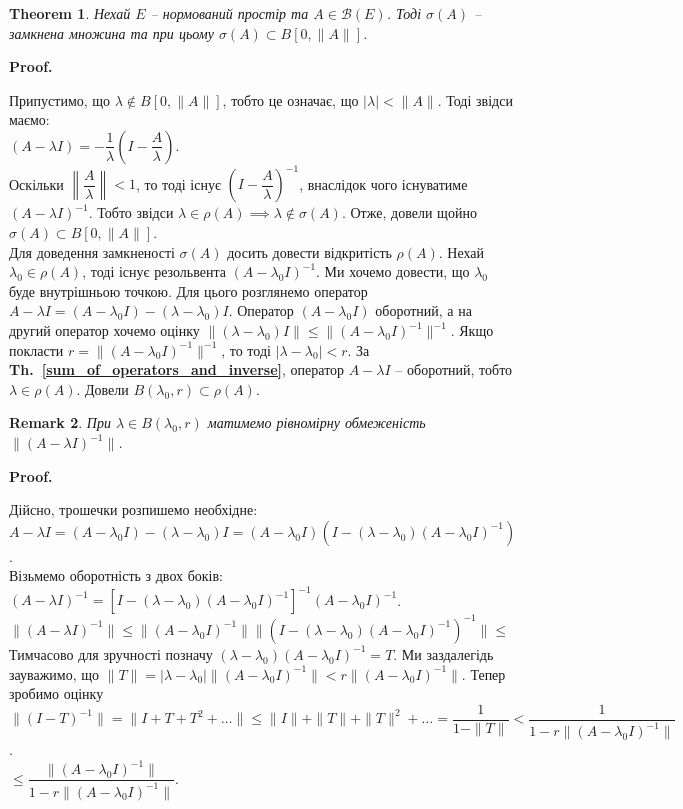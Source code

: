 \documentclass[a4paper, 10pt]{article}
\makeatletter
\theoremstyle{theoremdd}
\newtheorem{theorem}{Theorem}[subsection]
\theoremstyle{theoremdd}
\theoremstyle{theoremdd}
\theoremstyle{theoremdd}
\theoremstyle{theoremdd}
\theoremstyle{theoremdd}
\newtheorem{remark}[theorem]{Remark}
\theoremstyle{theoremdd}
\theoremstyle{theoremdd}
\newcommand\thref[1]{\textbf{Th.~\ref{#1}}}
\renewenvironment{proof}[1][Proof.\\]{\par
\pushQED{\hfill \qed}%
\normalfont \topsep6\p@\@plus6\p@\relax
\trivlist
\item\relax
{\bfseries
#1\@addpunct{.}}\hspace\labelsep\ignorespaces
}{%
\popQED\endtrivlist\@endpefalse
}
\makeatother
\begin{document}
\begin{theorem}
Нехай $E$ -- нормований простір та $A \in \mathcal{B}(E)$. Тоді $\sigma(A)$ -- замкнена множина та при цьому $\sigma(A) \subset B[0, \|A\|]$.
\end{theorem}

\begin{proof}
Припустимо, що $\lambda \notin B[0, \|A\|]$, тобто це означає, що $|\lambda| < \|A\|$. Тоді звідси маємо:\\
$(A-\lambda I) = -\dfrac{1}{\lambda}\left(I - \dfrac{A}{\lambda}\right)$.\\
Оскільки $\left\| \dfrac{A}{\lambda} \right\| < 1$, то тоді існує $\left(I - \dfrac{A}{\lambda}\right)^{-1}$, внаслідок чого існуватиме $(A-\lambda I)^{-1}$. Тобто звідси $\lambda \in \rho(A) \implies \lambda \notin \sigma(A)$. Отже, довели щойно $\sigma(A) \subset B[0, \|A\|]$.\\
Для доведення замкненості $\sigma(A)$ досить довести відкритість $\rho(A)$. Нехай $\lambda_0 \in \rho(A)$, тоді існує резольвента $(A-\lambda_0 I)^{-1}$. Ми хочемо довести, що $\lambda_0$ буде внутрішньою точкою. Для цього розглянемо оператор $A-\lambda I = (A-\lambda_0 I) - (\lambda - \lambda_0)I$. Оператор $(A-\lambda_0 I)$ оборотний, а на другий оператор хочемо оцінку $\| (\lambda - \lambda_0) I\| \leq \| (A-\lambda_0 I)^{-1} \|^{-1}$. Якщо покласти $r = \|(A-\lambda_0 I)^{-1}\|^{-1}$, то тоді $|\lambda-\lambda_0| < r$. За \thref{sum_of_operators_and_inverse}, оператор $A-\lambda I$ -- оборотний, тобто $\lambda \in \rho(A)$. Довели $B(\lambda_0,r) \subset \rho(A)$.
\end{proof}

\begin{remark}
При $\lambda \in B(\lambda_0,r)$ матимемо рівномірну обмеженість $\|(A-\lambda I)^{-1}\|$.
\end{remark}

\begin{proof}
Дійсно, трошечки розпишемо необхідне:\\
$A -\lambda I = (A - \lambda_0 I) - (\lambda - \lambda_0) I = (A-\lambda_0 I) \left(I - (\lambda - \lambda_0)(A -\lambda_0 I)^{-1}\right)$.\\
Візьмемо оборотність з двох боків:\\
$(A - \lambda I)^{-1} = \left[ I - (\lambda - \lambda_0)(A-\lambda_0 I)^{-1}\right]^{-1} (A-\lambda_0 I)^{-1}$.\\
$\|(A-\lambda I)^{-1}\| \leq \| (A-\lambda_0 I)^{-1} \| \| (I- (\lambda - \lambda_0)(A-\lambda_0 I)^{-1})^{-1}\| \boxed{\leq}$\\
Тимчасово для зручності позначу $(\lambda-\lambda_0)(A - \lambda_0 I)^{-1} = T$. Ми заздалегідь зауважимо, що $\|T\| = |\lambda-\lambda_0| \|(A-\lambda_0I)^{-1}\| < r \|(A-\lambda_0 I)^{-1}\|$. Тепер зробимо оцінку\\
$\|(I-T)^{-1}\| = \| I + T + T^2 + \dots \| \leq \|I\| + \|T\| + \|T\|^2 + \dots = \dfrac{1}{1- \|T\|} < \dfrac{1}{1 - r \|(A-\lambda_0 I)^{-1} \|}$.\\
$\boxed{\leq} \dfrac{\|(A-\lambda_0 I)^{-1}\|}{1 - r \|(A-\lambda_0 I)^{-1}\|}$.
\end{proof}
\end{document}

